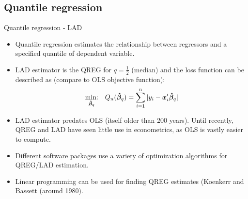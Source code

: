 \documentclass{beamer}
\begin{document}
\subsection{Quantile regression}
\begin{frame}{Quantile regression - LAD}
\begin{itemize}
\item Quantile regression estimates the relationship between regressors and a specified quantile of dependent variable.
\smallskip
\item LAD estimator is the QREG for $q=\tfrac{1}{2}$ (median) and the loss function can be described as (compare to OLS objective function): $$
\underset{\bm{\hat{\beta}}_{q}}{\textnormal{min:}} \quad Q_n(\bm{\hat{\beta}}_{q}) =
\sum_{i=1}^n |y_i-\bm{x}_i^{\prime}\bm{\hat{\beta}}_{q}|
$$
\item LAD estimator predates OLS (itself older than 200 years). Until recently, QREG and LAD have seen little use in econometrics, as OLS is vastly easier to compute.
\item Different software packages use a variety of optimization algorithms for QREG/LAD estimation.
\item Linear programming can be used for finding QREG estimates (Koenkerr and Bassett (around 1980).
\end{itemize}
\end{frame}
\end{document}
